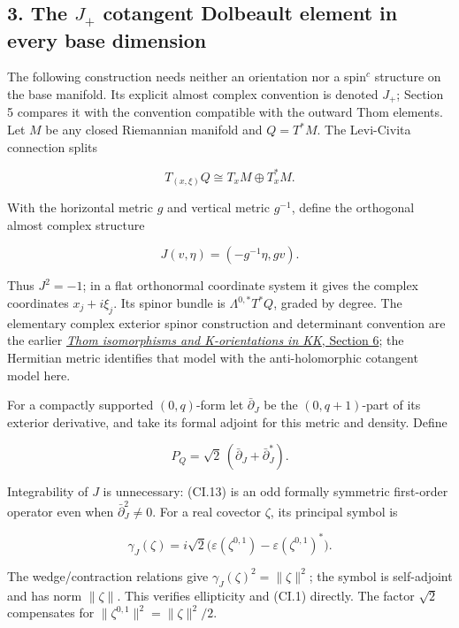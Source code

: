\documentclass[
  11pt,
]{article}
\begin{document}
\subsection{\texorpdfstring{3. The \(J_+\) cotangent Dolbeault element
in every base
dimension}{3. The J\_+ cotangent Dolbeault element in every base dimension}}\label{the-j_-cotangent-dolbeault-element-in-every-base-dimension}

The following construction needs neither an orientation nor a
spin\(^{c}\) structure on the base manifold. Its explicit almost complex
convention is denoted \(J_+\); Section 5 compares it with the convention
compatible with the outward Thom elements. Let \(M\) be any closed
Riemannian manifold and \(Q=T^*M\). The Levi-Civita connection splits

\[
 T_{(x,\xi)}Q\cong T_xM\oplus T_x^*M.
\]

With the horizontal metric \(g\) and vertical metric \(g^{-1}\), define
the orthogonal almost complex structure

\[
 J(v,\eta)=(-g^{-1}\eta,gv).
 \tag{CI.12}
\]

Thus \(J^2=-1\); in a flat orthonormal coordinate system it gives the
complex coordinates \(x_j+i\xi_j\). Its spinor bundle is
\(\Lambda^{0,*}T^*Q\), graded by degree. The elementary complex exterior
spinor construction and determinant convention are the earlier
\href{KT-KK-13.html\#6-complex-bundles-and-relative-symbols}{\emph{Thom
isomorphisms and K-orientations in KK}, Section 6}; the Hermitian metric
identifies that model with the anti-holomorphic cotangent model here.

For a compactly supported \((0,q)\)-form let \(\bar\partial_J\) be the
\((0,q+1)\)-part of its exterior derivative, and take its formal adjoint
for this metric and density. Define

\[
 P_Q=\sqrt2\,(\bar\partial_J+\bar\partial_J^*).
 \tag{CI.13}
\]

Integrability of \(J\) is unnecessary: (CI.13) is an odd formally
symmetric first-order operator even when \(\bar\partial_J^2\ne0\). For a
real covector \(\zeta\), its principal symbol is

\[
 \gamma_J(\zeta)
 =i\sqrt2\big(\varepsilon(\zeta^{0,1})
                 -\varepsilon(\zeta^{0,1})^*\big).
 \tag{CI.14}
\]

The wedge/contraction relations give \(\gamma_J(\zeta)^2=\|\zeta\|^2\);
the symbol is self-adjoint and has norm \(\|\zeta\|\). This verifies
ellipticity and (CI.1) directly. The factor \(\sqrt2\) compensates for
\(\|\zeta^{0,1}\|^2=\|\zeta\|^2/2\).
\end{document}
